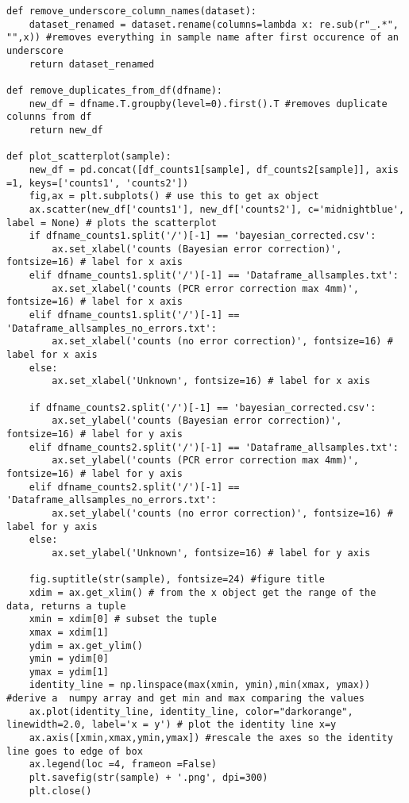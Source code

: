 \begin{footnotesize}
\begin{lstlisting}
def remove_underscore_column_names(dataset):
    dataset_renamed = dataset.rename(columns=lambda x: re.sub(r"_.*", "",x)) #removes everything in sample name after first occurence of an underscore
    return dataset_renamed

def remove_duplicates_from_df(dfname):
    new_df = dfname.T.groupby(level=0).first().T #removes duplicate colunns from df
    return new_df

def plot_scatterplot(sample):
    new_df = pd.concat([df_counts1[sample], df_counts2[sample]], axis =1, keys=['counts1', 'counts2'])
    fig,ax = plt.subplots() # use this to get ax object
    ax.scatter(new_df['counts1'], new_df['counts2'], c='midnightblue', label = None) # plots the scatterplot
    if dfname_counts1.split('/')[-1] == 'bayesian_corrected.csv':
        ax.set_xlabel('counts (Bayesian error correction)', fontsize=16) # label for x axis
    elif dfname_counts1.split('/')[-1] == 'Dataframe_allsamples.txt':
        ax.set_xlabel('counts (PCR error correction max 4mm)', fontsize=16) # label for x axis
    elif dfname_counts1.split('/')[-1] == 'Dataframe_allsamples_no_errors.txt':
        ax.set_xlabel('counts (no error correction)', fontsize=16) # label for x axis
    else:
        ax.set_xlabel('Unknown', fontsize=16) # label for x axis

    if dfname_counts2.split('/')[-1] == 'bayesian_corrected.csv':
        ax.set_ylabel('counts (Bayesian error correction)', fontsize=16) # label for y axis
    elif dfname_counts2.split('/')[-1] == 'Dataframe_allsamples.txt':
        ax.set_ylabel('counts (PCR error correction max 4mm)', fontsize=16) # label for y axis
    elif dfname_counts2.split('/')[-1] == 'Dataframe_allsamples_no_errors.txt':
        ax.set_ylabel('counts (no error correction)', fontsize=16) # label for y axis
    else:
        ax.set_ylabel('Unknown', fontsize=16) # label for y axis

    fig.suptitle(str(sample), fontsize=24) #figure title
    xdim = ax.get_xlim() # from the x object get the range of the data, returns a tuple
    xmin = xdim[0] # subset the tuple
    xmax = xdim[1]
    ydim = ax.get_ylim()
    ymin = ydim[0]
    ymax = ydim[1]
    identity_line = np.linspace(max(xmin, ymin),min(xmax, ymax)) #derive a  numpy array and get min and max comparing the values
    ax.plot(identity_line, identity_line, color="darkorange", linewidth=2.0, label='x = y') # plot the identity line x=y
    ax.axis([xmin,xmax,ymin,ymax]) #rescale the axes so the identity line goes to edge of box
    ax.legend(loc =4, frameon =False)
    plt.savefig(str(sample) + '.png', dpi=300)
    plt.close()


\end{lstlisting}
\end{footnotesize}
